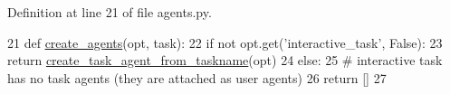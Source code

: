 Definition at line 21 of file agents.\+py.


\begin{DoxyCode}
21 \textcolor{keyword}{def }\hyperlink{namespaceparlai_1_1tasks_1_1wizard__of__wikipedia_1_1agents_a89bd55d60a50f2604b1eb59ab0e064bc}{create\_agents}(opt, task):
22     \textcolor{keywordflow}{if} \textcolor{keywordflow}{not} opt.get(\textcolor{stringliteral}{'interactive\_task'}, \textcolor{keyword}{False}):
23         \textcolor{keywordflow}{return} \hyperlink{namespaceparlai_1_1core_1_1agents_ab4473fa54af02b5ab385b41b51dacd10}{create\_task\_agent\_from\_taskname}(opt)
24     \textcolor{keywordflow}{else}:
25         \textcolor{comment}{# interactive task has no task agents (they are attached as user agents)}
26         \textcolor{keywordflow}{return} []
27 \end{DoxyCode}
